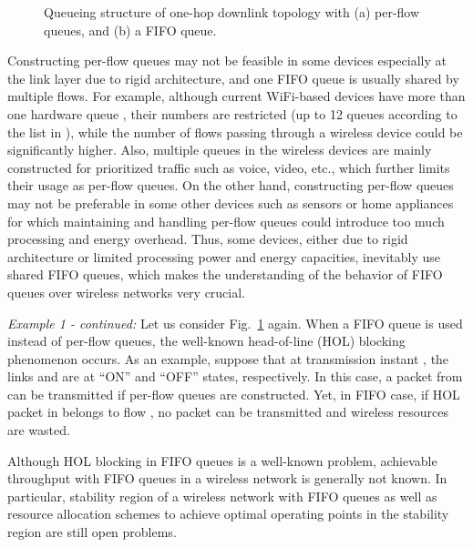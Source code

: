 \documentclass[conference]{IEEEtran}
\begin{document}
\begin{figure}[t!]
\vspace{-20pt}
\centering
{}
\vspace{-5pt}
\caption{Queueing structure of one-hop downlink topology with (a) per-flow queues, and (b) a FIFO queue. } \label{fig:example_fifo_v1}
\vspace{-15pt}
\end{figure}

Constructing per-flow queues may not be feasible in some devices especially at the link layer due to rigid architecture, and one FIFO queue is usually shared by multiple flows. For example, although current WiFi-based devices have more than one hardware queue \cite{madwifi_chipsets}, their numbers are restricted (up to 12 queues according to the list in \cite{madwifi_chipsets}), while the number of flows passing through a wireless device could be significantly higher. Also, multiple queues in the wireless devices are mainly constructed for prioritized traffic such as voice, video, etc., which further limits their usage as per-flow queues. 
On the other hand, constructing per-flow queues may not be preferable in some other devices such as sensors or home appliances for which maintaining and handling per-flow queues could introduce too much processing and energy overhead. Thus, some devices, either due to rigid architecture or limited processing power and energy capacities, inevitably use shared FIFO queues, which makes the understanding of the behavior of FIFO queues over wireless networks very crucial.


{\em Example 1 - continued:}
Let us consider Fig.~\ref{fig:example_fifo_v1} again. When a FIFO queue is used instead of per-flow queues, the well-known head-of-line (HOL) blocking phenomenon occurs. As an example, suppose that at transmission instant , the links  and  are at ``ON'' and ``OFF'' states, respectively. In this case, a packet from  can be transmitted if per-flow queues are constructed. Yet, in FIFO case, if HOL packet in  belongs to flow , no packet can be transmitted and wireless resources are wasted.
\hfill 

Although HOL blocking in FIFO queues is a well-known problem, achievable throughput with FIFO queues in a wireless network is generally not known. In particular, stability region of a wireless network with FIFO queues as well as resource allocation schemes to achieve optimal operating points in the stability region are still open problems.
\end{document}
